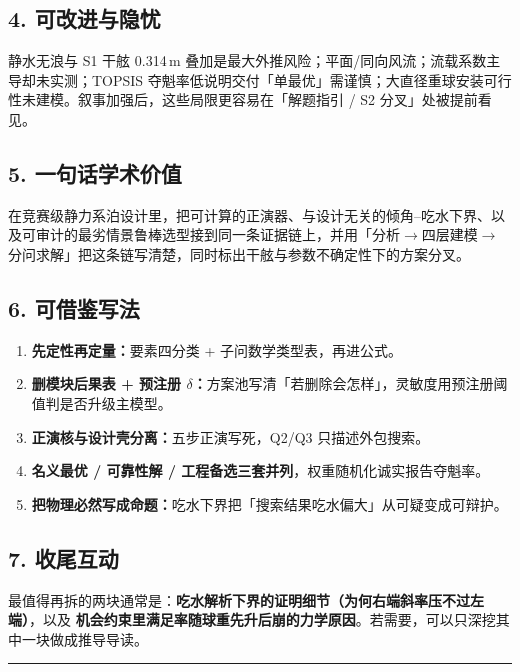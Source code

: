 \documentclass[UTF8,a4paper,zihao=-4]{ctexart}
\begin{document}
\subsection{\texorpdfstring{4. 可改进与隐忧}{4. 可改进与隐忧}}

静水无浪与 S1 干舷 0.314\,m 叠加是最大外推风险；平面/同向风流；流载系数主导却未实测；TOPSIS 夺魁率低说明交付「单最优」需谨慎；大直径重球安装可行性未建模。叙事加强后，这些局限更容易在「解题指引 / S2 分叉」处被提前看见。

\subsection{\texorpdfstring{5. 一句话学术价值}{5. 一句话学术价值}}

在竞赛级静力系泊设计里，把可计算的正演器、与设计无关的倾角--吃水下界、以及可审计的最劣情景鲁棒选型接到同一条证据链上，并用「分析$\to$四层建模$\to$分问求解」把这条链写清楚，同时标出干舷与参数不确定性下的方案分叉。

\subsection{\texorpdfstring{6. 可借鉴写法}{6. 可借鉴写法}}

\begin{enumerate}[leftmargin=1.8em]
\item \textbf{先定性再定量：}要素四分类 + 子问数学类型表，再进公式。
\item \textbf{删模块后果表 + 预注册 \(\delta\)：}方案池写清「若删除会怎样」，灵敏度用预注册阈值判是否升级主模型。
\item \textbf{正演核与设计壳分离：}五步正演写死，Q2/Q3 只描述外包搜索。
\item \textbf{名义最优 / 可靠性解 / 工程备选三套并列}，权重随机化诚实报告夺魁率。
\item \textbf{把物理必然写成命题：}吃水下界把「搜索结果吃水偏大」从可疑变成可辩护。
\end{enumerate}

\subsection{\texorpdfstring{7. 收尾互动}{7. 收尾互动}}

最值得再拆的两块通常是：\textbf{吃水解析下界的证明细节（为何右端斜率压不过左端）}，以及 \textbf{机会约束里满足率随球重先升后崩的力学原因}。若需要，可以只深挖其中一块做成推导导读。

\vspace{0.4em}\hrule\vspace{0.4em}
\end{document}
